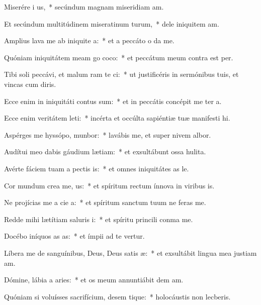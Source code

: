 \item Miserére i us,~* secúndum magnam miseridiam am.
\item Et secúndum multitúdinem miseratinum turum,~* dele iniquitem am.
\item Amplius lava me ab iniquite a:~* et a peccáto o da me.
\item Quóniam iniquitátem meam go coco:~* et peccátum meum contra  est per.
\item Tibi soli peccávi, et malum ram te ci:~* ut justificéris in sermónibus tuis, et vincas cum diris.
\item Ecce enim in iniquitáti contus sum:~* et in peccátis concépit me ter a.
\item Ecce enim veritátem leti:~* incérta et occúlta sapiéntiæ tuæ manifesti hi.
\item Aspérges me hyssópo,  munbor:~* lavábis me, et super nivem albor.
\item Audítui meo dabis gáudium  lætiam:~* et exsultábunt ossa hulita.
\item Avérte fáciem tuam a pectis is:~* et omnes iniquitátes as le.
\item Cor mundum crea  me, us:~* et spíritum rectum ínnova in viribus is.
\item Ne projícias me a cie a:~* et spíritum sanctum tuum ne feras  me.
\item Redde mihi lætítiam saluris i:~* et spíritu princili conma me.
\item Docébo iníquos as as:~* et ímpii ad te vertur.
\item Líbera me de sanguínibus, Deus, Deus satis æ:~* et exsultábit lingua mea justiam am.
\item Dómine, lábia a aries:~* et os meum annuntiábit dem am.
\item Quóniam si voluísses sacrifícium, desem tique:~* holocáustis non lecberis.
